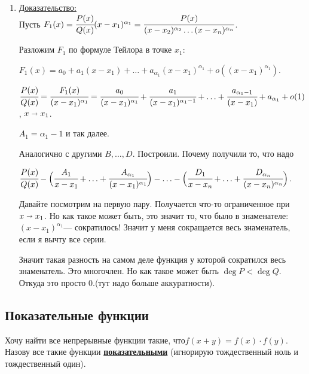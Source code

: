 \documentclass{article}
\newcommand{\deff}[1]{\underline{\textbf{#1}}}
\newcommand{\prooff}[1]{{\underline{Доказательство:}} \\ }
\begin{document}
\begin{enumerate}
    \item[] \prooff{}
    Пусть $F_1(x) = \cfrac{P(x)}{Q(x)}(x-x_1)^{\alpha_1} = \cfrac{P(x)}{(x-x_2)^{\alpha_2}\ldots(x-x_n)^{\alpha_n}}$.

    Разложим $F_1$ по формуле Тейлора в точке $x_1$:

    $F_1(x) = a_0 + a_1(x-x_1) + \ldots + a_{\alpha_1}(x-x_1)^{\alpha_1}+o((x-x_1)^{\alpha_1})$.

    $\cfrac{P(x)}{Q(x)} = \cfrac{F_1(x)}{(x-x_1)^{\alpha_1}} = \cfrac{a_0}{(x-x_1)^{\alpha_1}} + \cfrac{a_1}{(x-x_1)^{\alpha_1-1}}+\ldots + \cfrac{a_{\alpha_1-1}}{(x-x_1)} + a_{\alpha_1}+o(1)$, $x\shortrightarrow x_1$.

    $A_1 = \alpha_1-1$  и так далее.

    Аналогично с другими $B,\ldots, D$. Построили. Почему получили то, что надо

    $\cfrac{P(x)}{Q(x)}-\Big(\cfrac{A_1}{x-x_1}+\ldots + \cfrac{A_{\alpha_1}}{(x-x_1)^{\alpha_1}}\Big)-\ldots -\Big(\cfrac{D_1}{x-x_n}+ \ldots + \cfrac{D_{\alpha_n}}{(x-x_n)^{\alpha_n}}\Big)$.

    Давайте посмотрим на первую пару. Получается что-то ограниченное при $x\shortrightarrow x_1$. Но как такое может быть, это значит то, что было в знаменателе: $(x-x_1)^{\alpha_1}$--- сократилось! Значит у меня сокращается весь знаменатель, если я вычту все серии.

    Значит такая разность на самом деле функция у которой сократился весь знаменатель. Это многочлен. Но как такое может быть $\deg P<\deg Q$. Откуда это просто 0.(тут надо больше аккуратности).
\end{enumerate}



















\pagebreak
\subsection{Показательные функции}

Хочу найти все непрерывные функции такие, что$f(x+y) = f(x) \cdot f(y) $. Назову все такие функции \deff{показательными} (игнорирую тождественный ноль и тождественный один).
\end{document}
